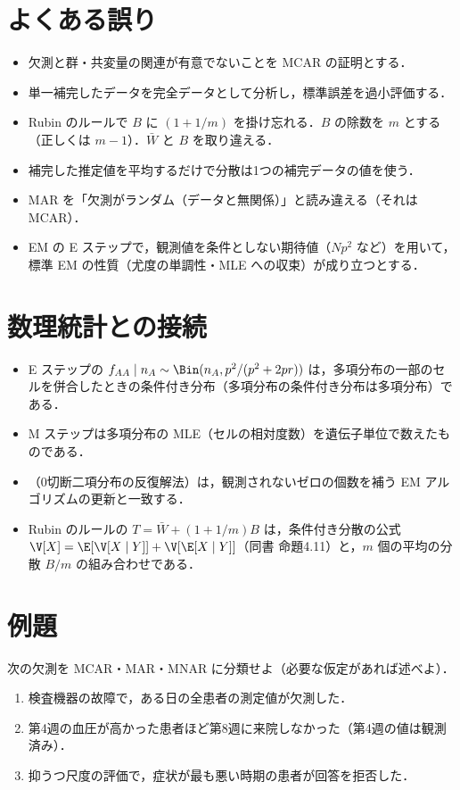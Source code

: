 \section{よくある誤り}\label{sec:16-err}
\begin{warnbox}
\begin{itemize}
\item 欠測と群・共変量の関連が有意でないことを MCAR の証明とする．
\item 単一補完したデータを完全データとして分析し，標準誤差を過小評価する．
\item Rubin のルールで $B$ に $(1+1/m)$ を掛け忘れる．$B$ の除数を $m$ とする（正しくは $m-1$）．$\bar W$ と $B$ を取り違える．
\item 補完した推定値を平均するだけで分散は1つの補完データの値を使う．
\item MAR を「欠測がランダム（データと無関係）」と読み違える（それは MCAR）．
\item EM の E ステップで，観測値を条件としない期待値（$Np^2$ など）を用いて，標準 EM の性質（尤度の単調性・MLE への収束）が成り立つとする．
\end{itemize}
\end{warnbox}

\section{数理統計との接続}\label{sec:16-link}
\begin{linkbox}
\begin{itemize}
\item E ステップの $f_{AA}\mid n_A\sim\Bin(n_A,p^2/(p^2+2pr))$ は，多項分布の一部のセルを併合したときの条件付き分布（多項分布の条件付き分布は多項分布）である．
\item M ステップは多項分布の MLE（セルの相対度数）を遺伝子単位で数えたものである．
\item {}（0切断二項分布の反復解法）は，観測されないゼロの個数を補う EM アルゴリズムの更新と一致する．
\item Rubin のルールの $T=\bar W+(1+1/m)B$ は，条件付き分散の公式 $\V[X]=\E[\V[X\mid Y]]+\V[\E[X\mid Y]]$（同書 命題4.11）と，$m$ 個の平均の分散 $B/m$ の組み合わせである．
\end{itemize}
\end{linkbox}

\section{例題}\label{sec:16-ex}
\begin{reidai}[欠測メカニズムの分類]\label{reidai:16-1}
次の欠測を MCAR・MAR・MNAR に分類せよ（必要な仮定があれば述べよ）．
\begin{enumerate}[label=(\arabic*)]
\item 検査機器の故障で，ある日の全患者の測定値が欠測した．
\item 第4週の血圧が高かった患者ほど第8週に来院しなかった（第4週の値は観測済み）．
\item 抑うつ尺度の評価で，症状が最も悪い時期の患者が回答を拒否した．
\end{enumerate}
\end{reidai}

